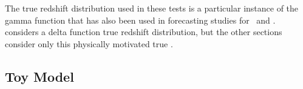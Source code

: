 %
%

The true redshift distribution used in these tests is a particular instance of the gamma function that has also been used in forecasting studies for \des\ and \lsst.
 considers a delta function true redshift distribution, but the other sections consider only this physically motivated true \nz.

\subsection{Toy Model}


